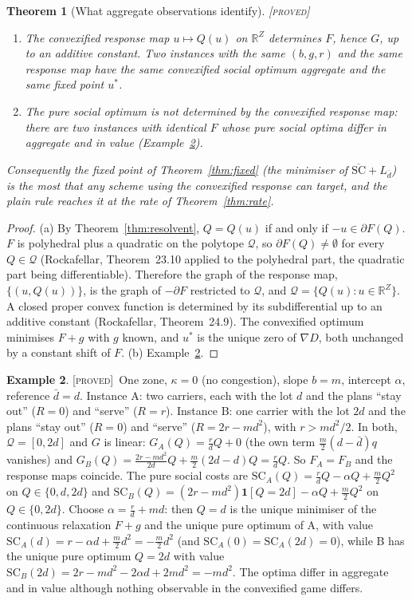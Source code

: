 \documentclass[11pt]{article}
\newtheorem{theorem}{Theorem}
\theoremstyle{definition}
\newtheorem{example}[theorem]{Example}
\theoremstyle{remark}
\newcommand{\R}{\mathbb{R}}
\newcommand{\cQ}{\mathcal{Q}}
\newcommand{\dbar}{\bar d}
\newcommand{\SC}{\mathrm{SC}}
\newcommand{\SCbar}{\overline{\mathrm{SC}}}
\newcommand{\PROVED}{{\normalfont\textsc{[proved]}}}
\begin{document}
\begin{theorem}[What aggregate observations identify]\label{thm:ident}\PROVED\
\begin{enumerate}[label=(\alph*)]
\item The convexified response map $u\mapsto Q(u)$ on $\R^Z$ determines $F$, hence $G$, up to an additive constant. Two instances with the same $(b,g,r)$ and the same response map have the same convexified social optimum aggregate and the same fixed point $u^*$.
\item The pure social optimum is not determined by the convexified response map: there are two instances with identical $F$ whose pure social optima differ in aggregate and in value (Example~\ref{ex:ident}).
\end{enumerate}
Consequently the fixed point of Theorem~\ref{thm:fixed} (the minimiser of $\SCbar+L_{\dbar}$) is the most that any scheme using the convexified response can target, and the plain rule reaches it at the rate of Theorem~\ref{thm:rate}.
\end{theorem}
\begin{proof}
(a) By Theorem~\ref{thm:resolvent}, $Q=Q(u)$ if and only if $-u\in\partial F(Q)$. $F$ is polyhedral plus a quadratic on the polytope $\cQ$, so $\partial F(Q)\ne\emptyset$ for every $Q\in\cQ$ (Rockafellar, Theorem~23.10 applied to the polyhedral part, the quadratic part being differentiable). Therefore the graph of the response map, $\{(u,Q(u))\}$, is the graph of $-\partial F$ restricted to $\cQ$, and $\cQ=\{Q(u):u\in\R^Z\}$. A closed proper convex function is determined by its subdifferential up to an additive constant (Rockafellar, Theorem~24.9). The convexified optimum minimises $F+g$ with $g$ known, and $u^*$ is the unique zero of $\nabla D$, both unchanged by a constant shift of $F$.
(b) Example~\ref{ex:ident}.
\end{proof}

\begin{example}\label{ex:ident}\PROVED\
One zone, $\kappa=0$ (no congestion), slope $b=m$, intercept $\alpha$, reference $\dbar=d$. Instance A: two carriers, each with the lot $d$ and the plans ``stay out'' ($R=0$) and ``serve'' ($R=r$). Instance B: one carrier with the lot $2d$ and the plans ``stay out'' ($R=0$) and ``serve'' ($R=2r-md^2$), with $r>md^2/2$. In both, $\cQ=[0,2d]$ and $G$ is linear: $G_A(Q)=\tfrac{r}{d}Q+0$ (the own term $\tfrac m2(d-\dbar)q$ vanishes) and $G_B(Q)=\tfrac{2r-md^2}{2d}Q+\tfrac m2(2d-d)Q=\tfrac rdQ$. So $F_A=F_B$ and the response maps coincide. The pure social costs are $\SC_A(Q)=\tfrac rdQ-\alpha Q+\tfrac m2Q^2$ on $Q\in\{0,d,2d\}$ and $\SC_B(Q)=(2r-md^2)\mathbf 1[Q=2d]-\alpha Q+\tfrac m2Q^2$ on $Q\in\{0,2d\}$. Choose $\alpha=\tfrac rd+md$: then $Q=d$ is the unique minimiser of the continuous relaxation $F+g$ and the unique pure optimum of A, with value $\SC_A(d)=r-\alpha d+\tfrac m2d^2=-\tfrac m2d^2$ (and $\SC_A(0)=\SC_A(2d)=0$), while B has the unique pure optimum $Q=2d$ with value $\SC_B(2d)=2r-md^2-2\alpha d+2md^2=-md^2$. The optima differ in aggregate and in value although nothing observable in the convexified game differs.
\end{example}
\end{document}
